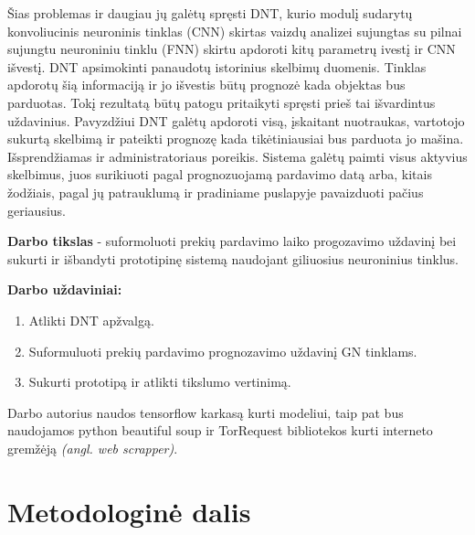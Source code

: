 \documentclass{VUMIFPSkursinis}
\begin{document}
Šias problemas ir daugiau jų galėtų spręsti DNT, kurio modulį sudarytų konvoliucinis neuroninis tinklas (CNN) skirtas vaizdų analizei sujungtas su pilnai sujungtu neuroniniu tinklu (FNN) skirtu apdoroti kitų parametrų ivestį ir CNN išvestį. DNT apsimokinti panaudotų istorinius skelbimų duomenis. Tinklas apdorotų šią informaciją ir jo išvestis būtų prognozė kada objektas bus parduotas. Tokį rezultatą būtų patogu pritaikyti spręsti prieš tai išvardintus uždavinius. Pavyzdžiui DNT galėtų apdoroti visą, įskaitant nuotraukas, vartotojo sukurtą skelbimą ir pateikti prognozę kada tikėtiniausiai bus parduota jo mašina. Išsprendžiamas ir administratoriaus poreikis. Sistema galėtų paimti visus aktyvius skelbimus, juos surikiuoti pagal prognozuojamą pardavimo datą arba, kitais žodžiais, pagal jų patrauklumą ir pradiniame puslapyje pavaizduoti pačius geriausius. 

\textbf{Darbo tikslas} - suformoluoti prekių pardavimo laiko progozavimo uždavinį bei sukurti ir išbandyti prototipinę sistemą naudojant giliuosius neuroninius tinklus.

\vspace{3mm} %

\textbf{Darbo uždaviniai:}
\begin{enumerate}
  \item Atlikti DNT apžvalgą.%
  \item Suformuluoti prekių pardavimo prognozavimo uždavinį GN tinklams.
  \item Sukurti prototipą ir atlikti tikslumo vertinimą.
\end{enumerate}

Darbo autorius naudos tensorflow karkasą kurti modeliui, taip pat bus naudojamos python beautiful soup ir TorRequest bibliotekos kurti interneto gremžėją \textit{(angl. web scrapper)}. 

\section{Metodologinė dalis}

\end{document}
